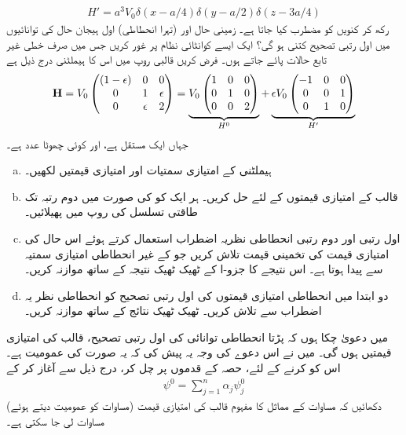 \begin{align*}
H' = a^3 V_0 \delta (x - a/4) \delta (y - a/2) \delta (z - 3a/4)
\end{align*}
 رکھ کر کنویں کو مضطرب کیا جاتا ہے۔ زمینی حال اور (تہرا انحطاطی) اول ہیجان حال کی توانائیوں میں اول رتبی تصحیح کتنی ہو گی؟
ایک ایسے کوانٹائی نظام پر غور کریں جس میں صرف  خطی غیر تابع حالات پائے جاتے ہوں۔ فرض کریں قالبی روپ میں اس کا ہیملٹنی درج ذیل ہے
\begin{align*}
\operatorname{\mathbf{H}} = V_0 
\begin{pmatrix}
(1 - \epsilon) & 0 & 0 \\
0 & 1 & \epsilon \\
0 & \epsilon & 2
\end{pmatrix}
= \underbrace{V_0 
\begin{pmatrix}
1 & 0 & 0 \\
0 & 1 & 0 \\
0 & 0 & 2
\end{pmatrix}}_{H^0} 
+ \underbrace{\epsilon V_0 
\begin{pmatrix}
-1 & 0 & 0 \\
0 & 0 & 1 \\
0 & 1 & 0
\end{pmatrix}}_{H'}
\end{align*}
جہاں  ایک مستقل ہے، اور  کوئی چھوٹا عدد  ہے۔
\begin{enumerate}[a.]
\item
{} ہیملٹنی  کے امتیازی سمتیات اور امتیازی قیمتیں لکھیں۔
\item
قالب  کے  امتیازی قیمتوں  کے لئے حل کریں۔ ہر ایک کو  کی صورت میں دوم رتبہ تک طاقتی تسلسل کی روپ میں پھیلائیں۔ 
\item
اول رتبی اور دوم رتبی  انحطاطی نظریہ اضطراب استعمال کرتے ہوئے اس حال کی امتیازی قیمت کی تخمینی قیمت تلاش کریں جو  کے غیر انحطاطی امتیازی سمتیہ سے پیدا ہوتا ہے۔ اس نتیجے کا جزو-ا کے ٹھیک ٹھیک نتیجہ کے ساتھ موازنہ کریں۔
\item
دو ابتدا میں انحطاطی امتیازی قیمتوں کی اول رتبی تصحیح کو انحطاطی نظر یہ اضطراب سے تلاش کریں۔ ٹھیک ٹھیک نتائج کے ساتھ موازنہ کریں۔ 
\end{enumerate}
میں دعویٰ چکا ہوں کہ  پڑتا انحطاطی توانائی کی اول رتبی تصحیح، قالب  کی امتیازی قیمتیں  ہوں گی۔ میں نے اس دعوے کی وجہ یہ پیش کی کہ یہ  صورت کی  عمومیت ہے۔ اس کو  کرنے کے لئے، حصہ  کے قدموں پر چل کر، درج ذیل سے آغاز کر کے
\begin{align*}
\psi^0 = \sum_{j = 1}^n \alpha_j \psi_j^0
\end{align*}
(مساوات  کو عمومیت دیتے ہوئے) دکھائیں کہ مساوات  کے مماثل کا مفہوم قالب  کی امتیازی قیمت مساوات لی جا سکتی ہے۔ 

